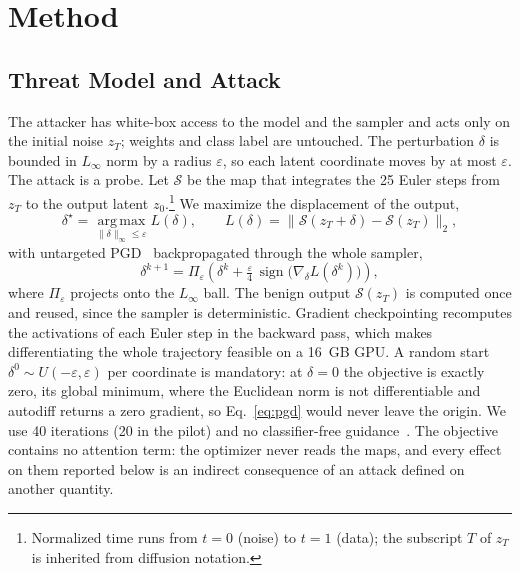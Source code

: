 \documentclass{article}
\begin{document}
\section{Method}\label{sec:method}

\subsection{Threat Model and Attack}

The attacker has white-box access to the model and the sampler and acts only on the initial noise $z_T$; weights and class label are untouched. The perturbation $\delta$ is bounded in $L_\infty$ norm by a radius $\varepsilon$, so each latent coordinate moves by at most $\varepsilon$. The attack is a probe. Let $\mathcal{S}$ be the map that integrates the 25 Euler steps from $z_T$ to the output latent $z_0$.\footnote{Normalized time runs from $t{=}0$ (noise) to $t{=}1$ (data); the subscript $T$ of $z_T$ is inherited from diffusion notation.} We maximize the displacement of the output,
\begin{equation}\label{eq:objective}
  \delta^\star = \operatorname*{arg\,max}_{\|\delta\|_\infty \le \varepsilon} L(\delta),
  \qquad
  L(\delta) = \bigl\| \mathcal{S}(z_T + \delta) - \mathcal{S}(z_T) \bigr\|_2 ,
\end{equation}
with untargeted PGD~\cite{madry2018towards} backpropagated through the whole sampler,
\begin{equation}\label{eq:pgd}
  \delta^{k+1} = \Pi_{\varepsilon}\!\left( \delta^{k} + \tfrac{\varepsilon}{4}\, \operatorname{sign}\!\bigl( \nabla_{\delta} L(\delta^{k}) \bigr) \right),
\end{equation}
where $\Pi_\varepsilon$ projects onto the $L_\infty$ ball. The benign output $\mathcal{S}(z_T)$ is computed once and reused, since the sampler is deterministic. Gradient checkpointing recomputes the activations of each Euler step in the backward pass, which makes differentiating the whole trajectory feasible on a 16~GB GPU. A random start $\delta^0 \sim U(-\varepsilon, \varepsilon)$ per coordinate is mandatory: at $\delta{=}0$ the objective is exactly zero, its global minimum, where the Euclidean norm is not differentiable and autodiff returns a zero gradient, so Eq.~\eqref{eq:pgd} would never leave the origin. We use 40 iterations (20 in the pilot) and no classifier-free guidance~\cite{ho2022classifier}. The objective contains no attention term: the optimizer never reads the maps, and every effect on them reported below is an indirect consequence of an attack defined on another quantity.
\end{document}
